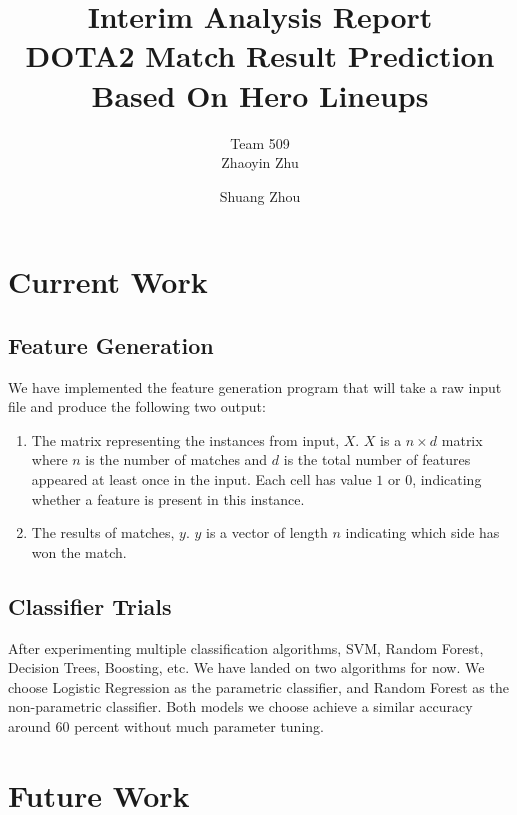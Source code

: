 \documentclass[11pt]{article}
\title{Interim Analysis Report\\DOTA2 Match Result Prediction Based On Hero Lineups}
\author[1]{Team 509\\Zhaoyin Zhu}
\author[2]{Shuang Zhou}
\affil[1]{Division of Biostatistics, School of Medicine, New York University}
\affil[2]{Department of Computer Science, New York University}
\begin{document}
\maketitle
\section{Current Work}
\subsection{Feature Generation}
We have implemented the feature generation program that will take a raw input file and produce the following two output:
\begin{enumerate}
\item The matrix representing the instances from input, $X$. $X$ is a $n\times d$ matrix where $n$ is the number of matches and $d$ is the total number of features appeared at least once in the input. Each cell has value $1$ or $0$, indicating whether a feature is present in this instance.
\item The results of matches, $y$. $y$ is a vector of length $n$ indicating which side has won the match.
\end{enumerate}
\subsection{Classifier Trials}
After experimenting multiple classification algorithms, SVM, Random Forest, Decision Trees, Boosting, etc. We have landed on two algorithms for now. We choose Logistic Regression as the parametric classifier, and Random Forest as the non-parametric classifier. Both models we choose achieve a similar accuracy around 60 percent without much parameter tuning.

\section{Future Work}
\end{document}
